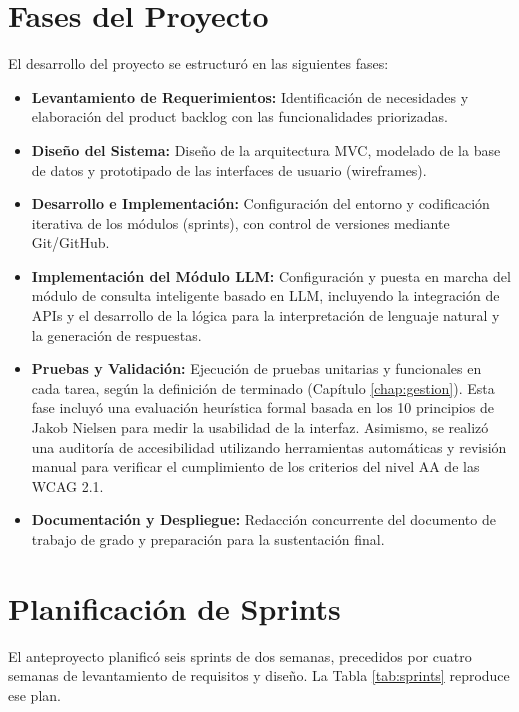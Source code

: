 \section{Fases del Proyecto}
\label{sec:fases_proyecto}
El desarrollo del proyecto se estructuró en las siguientes fases:
\begin{itemize}
    \item \textbf{Levantamiento de Requerimientos:} Identificación de necesidades y elaboración del product backlog con las funcionalidades priorizadas.
    \item \textbf{Diseño del Sistema:} Diseño de la arquitectura MVC, modelado de la base de datos y prototipado de las interfaces de usuario (wireframes).
    \item \textbf{Desarrollo e Implementación:} Configuración del entorno y codificación iterativa de los módulos (sprints), con control de versiones mediante Git/GitHub.
    \item \textbf{Implementación del Módulo LLM:} Configuración y puesta en marcha del módulo de consulta inteligente basado en LLM, incluyendo la integración de APIs y el desarrollo de la lógica para la interpretación de lenguaje natural y la generación de respuestas.
    \item \textbf{Pruebas y Validación:} Ejecución de pruebas unitarias y funcionales en cada tarea, según la definición de terminado (Capítulo \ref{chap:gestion}). Esta fase incluyó una evaluación heurística formal basada en los 10 principios de Jakob Nielsen para medir la usabilidad de la interfaz. Asimismo, se realizó una auditoría de accesibilidad utilizando herramientas automáticas y revisión manual para verificar el cumplimiento de los criterios del nivel AA de las WCAG 2.1.
    \item \textbf{Documentación y Despliegue:} Redacción concurrente del documento de trabajo de grado y preparación para la sustentación final.
\end{itemize}

\section{Planificación de Sprints}
\label{sec:planificacion_sprints}

El anteproyecto planificó seis sprints de dos semanas, precedidos por cuatro semanas de levantamiento de requisitos y diseño. La Tabla \ref{tab:sprints} reproduce ese plan.

